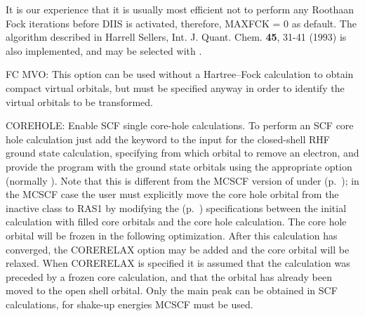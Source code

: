 
It is our experience that
it is usually most efficient not to perform any Roothaan Fock iterations
before DIIS is activated, therefore, MAXFCK = 0 as default.
The algorithm described in
Harrell Sellers, Int. J. Quant. Chem. {\bf 45}, 31-41 (1993) is
also implemented, and may be selected with .


FC MVO: This option can be used without a Hartree--Fock calculation
to obtain compact virtual orbitals, but  must be
specified anyway in order to identify the virtual orbitals to be transformed.

COREHOLE: Enable SCF
single core-hole calculations. To perform
an SCF core hole calculation just add the 
keyword to the input for the closed-shell RHF ground state
calculation, specifying from which orbital to remove an electron,
and provide the program with the ground state orbitals using the
appropriate  option (normally ).
Note that this is different from the MCSCF version of
 under 
(p.~\pageref{ref-optinp}); in the MCSCF case the user must
explicitly move the core hole orbital from the inactive class to
RAS1 by modifying the 
(p.~\pageref{ref-wavinp}) specifications between the initial
calculation with filled core orbitals and the core hole
calculation. The core hole orbital will be
frozen in the following optimization.
After this calculation has converged, the CORERELAX option may be
added and the core orbital will be relaxed.  
When CORERELAX is specified it is assumed that the
calculation was preceded by a frozen core calculation, and that
the orbital has already been moved to the open shell orbital. Only
the main peak can be obtained in SCF calculations, for shake-up
energies MCSCF must be used.

\pagebreak[3]
\subsection{\label{ref-stexinp}}

